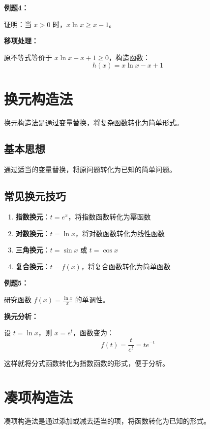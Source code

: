\documentclass[a4paper,11pt]{ctexrep}
\newcommand{\exampleicon}{\ModeBadge[highlight]{例题}}
\newcommand{\analysisicon}{\ModeBadge[secondary]{分析}}
\theoremstyle{definition}
\begin{document}
\exampleicon \textbf{例题4：}

证明：当 $x > 0$ 时，$x\ln x \geq x - 1$。

\analysisicon \textbf{移项处理：}

原不等式等价于 $x\ln x - x + 1 \geq 0$，构造函数：
$$h(x) = x\ln x - x + 1$$

\section{换元构造法}

换元构造法是通过变量替换，将复杂函数转化为简单形式。

\subsection{基本思想}

通过适当的变量替换，将原问题转化为已知的简单问题。

\subsection{常见换元技巧}

\begin{methodbox}[换元构造技巧]
\begin{enumerate}
    \item \textbf{指数换元}：$t = e^x$，将指数函数转化为幂函数
    \item \textbf{对数换元}：$t = \ln x$，将对数函数转化为线性函数
    \item \textbf{三角换元}：$t = \sin x$ 或 $t = \cos x$
    \item \textbf{复合换元}：$t = f(x)$，将复合函数转化为简单函数
\end{enumerate}
\end{methodbox}

\exampleicon \textbf{例题5：}

研究函数 $f(x) = \frac{\ln x}{x}$ 的单调性。

\analysisicon \textbf{换元分析：}

设 $t = \ln x$，则 $x = e^t$，函数变为：
$$f(t) = \frac{t}{e^t} = te^{-t}$$

这样就将分式函数转化为指数函数的形式，便于分析。

\section{凑项构造法}

凑项构造法是通过添加或减去适当的项，将函数转化为已知的形式。
\end{document}
